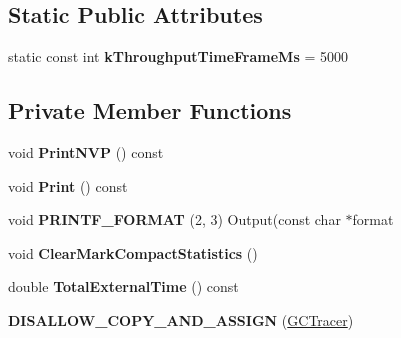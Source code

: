 \subsection*{Static Public Attributes}
\begin{DoxyCompactItemize}
\item 
static const int {\bfseries k\+Throughput\+Time\+Frame\+Ms} = 5000\hypertarget{classv8_1_1internal_1_1_g_c_tracer_af8ae0017f798fdca080409e71490110e}{}\label{classv8_1_1internal_1_1_g_c_tracer_af8ae0017f798fdca080409e71490110e}

\end{DoxyCompactItemize}
\subsection*{Private Member Functions}
\begin{DoxyCompactItemize}
\item 
void {\bfseries Print\+N\+VP} () const \hypertarget{classv8_1_1internal_1_1_g_c_tracer_adcbd8c26398f0fc721ae396a97cfc5c8}{}\label{classv8_1_1internal_1_1_g_c_tracer_adcbd8c26398f0fc721ae396a97cfc5c8}

\item 
void {\bfseries Print} () const \hypertarget{classv8_1_1internal_1_1_g_c_tracer_a07139f1e45e826a35c23306239e70c23}{}\label{classv8_1_1internal_1_1_g_c_tracer_a07139f1e45e826a35c23306239e70c23}

\item 
void {\bfseries P\+R\+I\+N\+T\+F\+\_\+\+F\+O\+R\+M\+AT} (2, 3) Output(const char $\ast$format\hypertarget{classv8_1_1internal_1_1_g_c_tracer_aed13913b3a2de30d3ed5bd94919440b5}{}\label{classv8_1_1internal_1_1_g_c_tracer_aed13913b3a2de30d3ed5bd94919440b5}

\item 
void {\bfseries Clear\+Mark\+Compact\+Statistics} ()\hypertarget{classv8_1_1internal_1_1_g_c_tracer_a900d1f35adf100b8cb9dc519286d0349}{}\label{classv8_1_1internal_1_1_g_c_tracer_a900d1f35adf100b8cb9dc519286d0349}

\item 
double {\bfseries Total\+External\+Time} () const \hypertarget{classv8_1_1internal_1_1_g_c_tracer_aa312a7e7734cb93fcafabb085779ab1a}{}\label{classv8_1_1internal_1_1_g_c_tracer_aa312a7e7734cb93fcafabb085779ab1a}

\item 
{\bfseries D\+I\+S\+A\+L\+L\+O\+W\+\_\+\+C\+O\+P\+Y\+\_\+\+A\+N\+D\+\_\+\+A\+S\+S\+I\+GN} (\hyperlink{classv8_1_1internal_1_1_g_c_tracer}{G\+C\+Tracer})\hypertarget{classv8_1_1internal_1_1_g_c_tracer_a2c21174496edc323cbd8e5a0cb7e68b7}{}\label{classv8_1_1internal_1_1_g_c_tracer_a2c21174496edc323cbd8e5a0cb7e68b7}

\end{DoxyCompactItemize}

